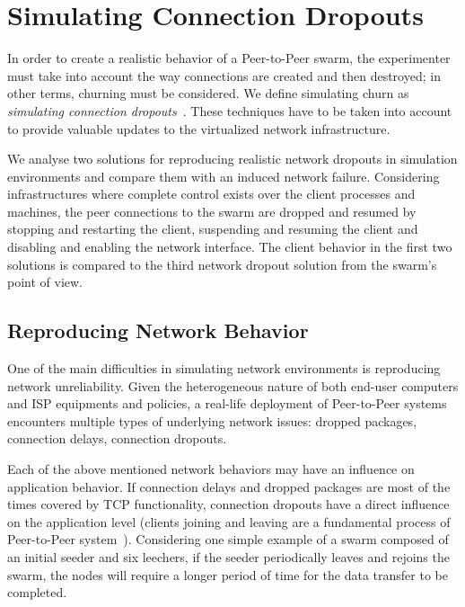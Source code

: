 \section{Simulating Connection Dropouts}
\label{sec:virt-infra:dropouts}

In order to create a realistic behavior of a Peer-to-Peer swarm, the
experimenter must take into account the way connections are created and then
destroyed; in other terms, churning must be considered. We define simulating
churn as \textit{simulating connection dropouts}~\cite{simulating-dropouts}.
These techniques have to be taken into account to provide valuable updates to
the virtualized network infrastructure.

We analyse two solutions for reproducing realistic network
dropouts in simulation environments and compare them with an induced network
failure. Considering infrastructures where complete control exists over the
client processes and machines, the peer connections to the swarm are dropped
and resumed by stopping and restarting the client, suspending and resuming the
client and disabling and enabling the network interface. The client behavior
in the first two solutions is compared to the third network dropout solution
from the swarm's point of view.

\subsection{Reproducing Network Behavior}
\label{subsec:virt-infra:behavior}

One of the main difficulties in simulating network environments is reproducing
network unreliability. Given the heterogeneous nature of both end-user
computers and ISP equipments and policies, a real-life deployment of
Peer-to-Peer systems encounters multiple types of underlying network issues:
dropped packages, connection delays, connection dropouts.

Each of the above mentioned network behaviors may have an influence on
application behavior. If connection delays and dropped packages are most of
the times covered by TCP functionality, connection dropouts have a direct
influence on the application level (clients joining and leaving are a
fundamental process of Peer-to-Peer system~\cite{p2p-file-sharing-workload}).
Considering one simple example of a swarm composed of an initial seeder and
six leechers, if the seeder periodically leaves and rejoins the swarm, the
nodes will require a longer period of time for the data transfer to be
completed.

